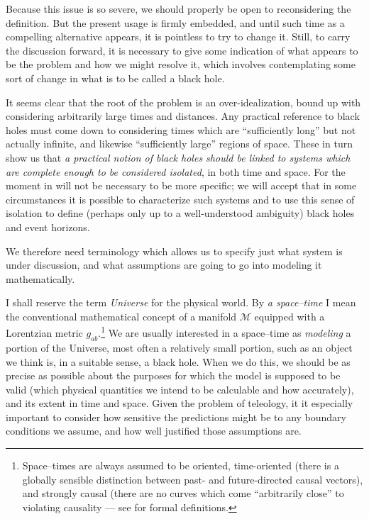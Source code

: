 \documentclass[
%
draft    %
,numberedheadings 
,bibliocites
  ]
  {aipproc}
\newcommand{\MM}{{\mathscr M}}
\begin{document}
Because this issue is so severe, we should properly be open to reconsidering the definition.  But the present usage is firmly embedded, and until such time as a compelling alternative appears, it is pointless to try to change it.  Still, to carry the discussion forward, it is necessary to give some indication of what appears to be the problem and how we might resolve it, which involves contemplating some sort of change in what is to be called a black hole.

It seems clear that the root of the problem is an over-idealization, bound up with considering arbitrarily large times and distances.  Any practical reference to black holes must come down to considering times which are ``sufficiently  long'' but not actually infinite, and likewise ``sufficiently large'' regions of space.  These in turn show us that {\em a practical notion of black holes should be linked to systems which are complete enough to be considered  isolated}, in both time and space.  For the moment in will not be necessary to be more specific; we will accept that in some circumstances it is possible to characterize such systems and to use this sense of isolation to define (perhaps only up to a 
well-understood ambiguity) black holes and event horizons.

We therefore need terminology which allows us to specify just what system is under discussion, and what assumptions are going to go into modeling it mathematically.

I shall reserve the term {\em Universe} for the physical world.  By {\em a space--time} I mean the conventional mathematical concept of a manifold $\MM$ equipped with a Lorentzian metric $g_{ab}$.\footnote{Space--times are always assumed to be oriented, time-oriented (there is a globally sensible distinction between past- and future-directed causal vectors), and strongly causal (there are no curves which come ``arbitrarily close'' to violating causality --- see \citet{Penrose:1972} for formal definitions.}  We are usually interested in a space--time as {\em modeling} a portion of the Universe, most often a relatively small portion, such as an object we think is, in a suitable sense, a black hole.  When we do this, we should be as precise as possible about the purposes for which the model is supposed to be valid (which physical quantities we intend to be calculable and how accurately), and its extent in time and space.  Given the problem of teleology, it it especially important to consider how sensitive the predictions might be to any boundary conditions we assume, and how well justified those assumptions are.  
\end{document}
